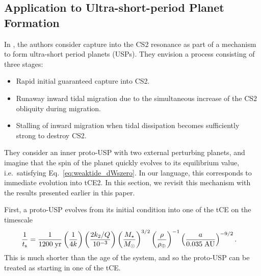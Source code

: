 \documentclass[
        fleqn,
        usenatbib,
    ]{mnras}
\newcommand*{\p}[1]{\left(#1\right)}
\begin{document}
\subsection{Application to Ultra-short-period Planet Formation
}\label{ss:disc_usp}

In \citet{millholland2020formation}, the authors consider capture into the CS2
resonance as part of a mechanism to form ultra-short period planets (USPs). They
envision a process consisting of three stages:
\begin{itemize}
    \item Rapid initial guaranteed capture into CS2.

    \item Runaway inward tidal migration due to the simultaneous increase of the
        CS2 obliquity during migration.

    \item Stalling of inward migration when tidal dissipation becomes
        sufficiently strong to destroy CS2.
\end{itemize}
They consider an inner proto-USP with two external perturbing planets, and
imagine that the spin of the planet quickly evolves to its equilibrium value,
i.e.\ satisfying Eq.~\eqref{eq:weaktide_dWszero}. In our language, this
corresponds to immediate evolution into tCE2. In this section, we revisit this
mechanism with the results presented earlier in this paper.

First, a proto-USP evolves from its initial condition into one of the tCE on the
timescale
\begin{align}
    \frac{1}{t_{\rm s}} ={}& \frac{1}{1200\;\mathrm{yr}}
            \p{\frac{1}{4k}}
            \p{\frac{2k_2/Q}{10^{-3}}}
            \p{\frac{M_\star}{M_{\odot}}}^{3/2}
            \p{\frac{\rho}{\rho_{\oplus}}}^{-1}
            \p{\frac{a}{0.035\;\mathrm{AU}}}^{-9/2}.
\end{align}
This is much shorter than the age of the system, and so the proto-USP can be
treated as starting in one of the tCE\@.
\end{document}
